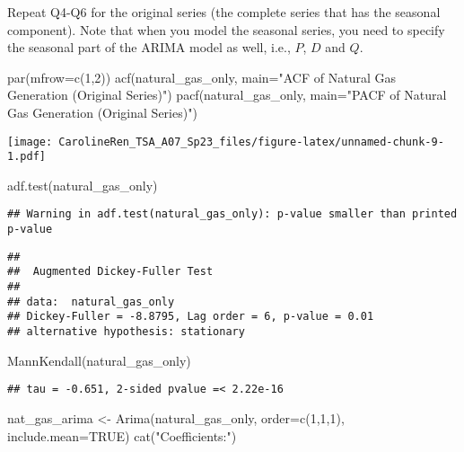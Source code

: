 \documentclass[
]{article}
\newenvironment{Shaded}{\begin{snugshade}}{\end{snugshade}}
\newcommand{\AttributeTok}[1]{\textcolor[rgb]{0.77,0.63,0.00}{#1}}
\newcommand{\ConstantTok}[1]{\textcolor[rgb]{0.00,0.00,0.00}{#1}}
\newcommand{\DecValTok}[1]{\textcolor[rgb]{0.00,0.00,0.81}{#1}}
\newcommand{\FunctionTok}[1]{\textcolor[rgb]{0.00,0.00,0.00}{#1}}
\newcommand{\NormalTok}[1]{#1}
\newcommand{\OtherTok}[1]{\textcolor[rgb]{0.56,0.35,0.01}{#1}}
\newcommand{\StringTok}[1]{\textcolor[rgb]{0.31,0.60,0.02}{#1}}
\begin{document}
Repeat Q4-Q6 for the original series (the complete series that has the
seasonal component). Note that when you model the seasonal series, you
need to specify the seasonal part of the ARIMA model as well, i.e.,
\(P\), \(D\) and \(Q\).

\begin{Shaded}
\begin{Highlighting}[]
\FunctionTok{par}\NormalTok{(}\AttributeTok{mfrow=}\FunctionTok{c}\NormalTok{(}\DecValTok{1}\NormalTok{,}\DecValTok{2}\NormalTok{))}
\FunctionTok{acf}\NormalTok{(natural\_gas\_only, }\AttributeTok{main=}\StringTok{"ACF of Natural Gas Generation (Original Series)"}\NormalTok{)}
\FunctionTok{pacf}\NormalTok{(natural\_gas\_only, }\AttributeTok{main=}\StringTok{"PACF of Natural Gas Generation (Original Series)"}\NormalTok{)}
\end{Highlighting}
\end{Shaded}

\texttt{[image: CarolineRen\_TSA\_A07\_Sp23\_files/figure-latex/unnamed-chunk-9-1.pdf]}

\begin{Shaded}
\begin{Highlighting}[]
\FunctionTok{adf.test}\NormalTok{(natural\_gas\_only)}
\end{Highlighting}
\end{Shaded}

\begin{verbatim}
## Warning in adf.test(natural_gas_only): p-value smaller than printed p-value
\end{verbatim}

\begin{verbatim}
## 
##  Augmented Dickey-Fuller Test
## 
## data:  natural_gas_only
## Dickey-Fuller = -8.8795, Lag order = 6, p-value = 0.01
## alternative hypothesis: stationary
\end{verbatim}

\begin{Shaded}
\begin{Highlighting}[]
\FunctionTok{MannKendall}\NormalTok{(natural\_gas\_only)}
\end{Highlighting}
\end{Shaded}

\begin{verbatim}
## tau = -0.651, 2-sided pvalue =< 2.22e-16
\end{verbatim}

\begin{Shaded}
\begin{Highlighting}[]
\NormalTok{nat\_gas\_arima }\OtherTok{\textless{}{-}} \FunctionTok{Arima}\NormalTok{(natural\_gas\_only, }\AttributeTok{order=}\FunctionTok{c}\NormalTok{(}\DecValTok{1}\NormalTok{,}\DecValTok{1}\NormalTok{,}\DecValTok{1}\NormalTok{), }\AttributeTok{include.mean=}\ConstantTok{TRUE}\NormalTok{)}
\FunctionTok{cat}\NormalTok{(}\StringTok{"Coefficients:"}\NormalTok{)}
\end{Highlighting}
\end{Shaded}
\end{document}
